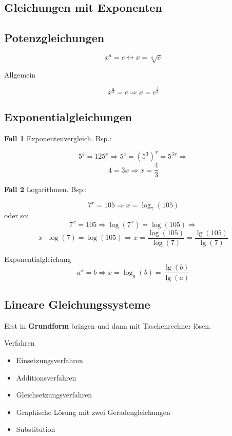 \begin{multicols}{2}


\section{Gleichungen mit Exponenten}
\subsection{Potenzgleichungen}

$$x^a=c \leftrightarrow x=\sqrt[a]{c}$$

Allgemein

$$x^{\frac{a}b} = c \Longrightarrow{}  x=c^{\frac{b}a}$$

\subsection{Exponentialgleichungen}
\textbf{Fall 1} Exponentenvergleich. Bsp.:

$$5^4=125^x \Rightarrow{} 5^4=(5^3)^x=5^{3x} \Rightarrow{}$$
$$ 4=3x \Rightarrow x=\frac43$$

\textbf{Fall 2} Logarithmen. Bsp.:

$$7^x=105 \Rightarrow x=\log_7(105)$$
oder so:
$$7^x=105 \Rightarrow \log(7^x)=\log(105) \Rightarrow$$
$$x\cdot{}\log(7)=\log(105) \Rightarrow x=\frac{\log(105)}{\log(7)} = \frac{\lg(105)}{\lg(7)}$$

\begin{gesetz}{Exponentialgleichung}{}
$$a^x=b \Rightarrow{} x=\log_a(b) = \frac{\lg(b)}{\lg(a)}$$
\end{gesetz}

\subsection{Lineare Gleichungssysteme}
Erst in \textbf{Grundform} bringen und dann
mit Taschenrechner  lösen.

Verfahren
\begin{itemize}
\item Einsetzungsverfahren
\item Additionsverfahren
\item Gleichsetzungsverfahren
\item Graphische Lösung mit zwei Geradengleichungen
\item Substitution
\end{itemize}



\end{multicols}
